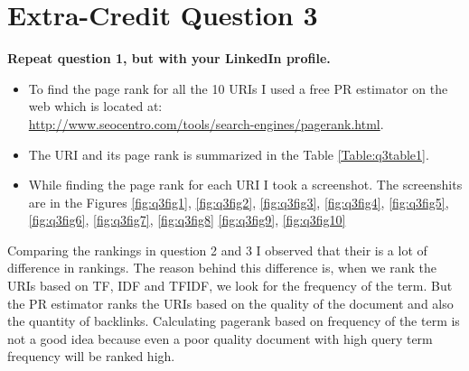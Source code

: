 \chapter{Extra-Credit Question 3}
\label{available-representation}

\textbf{Repeat question 1, but with your LinkedIn profile.}

\begin{itemize}
\item  To find the page rank for all the 10 URIs I used a free PR estimator on the web which is located at: \\
{\url{http://www.seocentro.com/tools/search-engines/pagerank.html}}. 
\item The URI and its page rank is summarized in the Table \ref{Table:q3table1}.
\item While finding the page rank for each URI I took a screenshot. The screenshits are in the Figures \ref{fig:q3fig1},  \ref{fig:q3fig2},  \ref{fig:q3fig3},  \ref{fig:q3fig4},  \ref{fig:q3fig5},  \ref{fig:q3fig6},  \ref{fig:q3fig7},  \ref{fig:q3fig8} \ref{fig:q3fig9},  \ref{fig:q3fig10}
\end{itemize}

Comparing the rankings in question 2 and 3 I observed that their is a lot of difference in rankings. The reason behind this difference is, when we rank the URIs based on TF, IDF and TFIDF, we look for the frequency of the term. But the PR estimator ranks the URIs based on the quality of the document and also the quantity of backlinks. Calculating pagerank based on frequency of the term is not a good idea because even a poor quality document with high query term frequency will be ranked high. 

